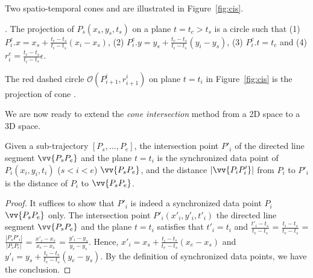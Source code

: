 Two spatio-temporal cones  and  are illustrated in Figure~\ref{fig:cis}.

. The projection of   \wrt $P_s(x_s, y_s, t_s)$ on a plane $t = t_c > t_s$ is a circle  such that (1)  $P^c_i.x = x_s +  \frac{t_c - t_s}{t_i - t_s}(x_i - x_s)$, (2)  $P^c_i.y = y_s +  \frac{t_c - t_s}{t_i - t_s}(y_i - y_s)$, (3)   $P^c_i.t = t_c$ and (4) $r^c_i =\frac{t_c-t_s}{t_i-t_s}{\epsilon}$.





The red dashed circle $\mathcal{O}(P^i_{i+1}, r^i_{i+1})$ on plane $t=t_i$ in Figure~\ref{fig:cis} is the projection of cone .

We are now ready to extend the \emph{cone intersection} method \cite{Williams:Longest, Sklansky:Cone, Zhao:Sleeve} from a 2D space to a 3D space.





\begin{lemma}
\label{prop-3d-syn-point}
Given a sub-trajectory $[P_s, \ldots, P_e]$, the intersection point $P'_i$ of the directed line segment $\vv{P_sP_e}$ and the plane $t=t_i$ is the synchronized data point of $P_i(x_i, y_i, t_i)$ ($s<i<e$) \wrt  $\vv{P_sP_e}$, and the distance $|\vv{P_iP'_i}|$ from $P_i$ to $P'_i$ is the \sed distance of $P_i$ to $\vv{P_sP_e}$.
\end{lemma}

\begin{proof} It suffices to show that $P'_i$ is indeed a synchronized data point $P_i$ \wrt $\vv{P_sP_e}$ only.
%
The intersection point $P'_i(x'_i, y'_i, t'_i)$ the directed line segment $\vv{P_sP_e}$ and the plane $t=t_i$ satisfies that $t'_i = t_i$ and $\frac{t'_i - t_s}{t_e - t_s}$ = $\frac{t_i - t_s}{t_e - t_s}$  = $\frac{|P_sP'_i|}{|P_sP_e|}$ = $\frac{x'_i - x_s}{x_e - x_s}$ = $\frac{y'_i - y_s}{y_e - y_s}$. Hence, $x'_i = x_s +  \frac{t_i-t_s}{t_e - t_s}(x_e - x_s)$ and $y'_i = y_s +  \frac{t_i - t_s}{t_e - t_s}(y_e - y_s)$.
%
By the definition of synchronized data points, we have the conclusion.
\end{proof}




